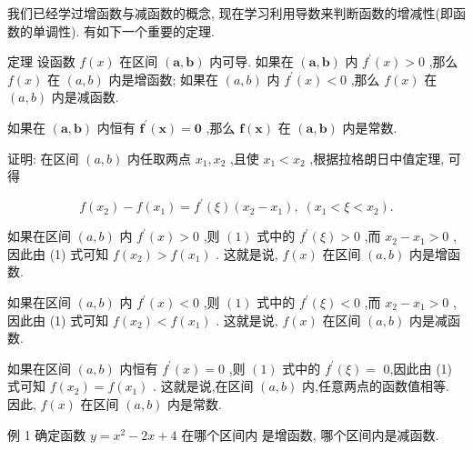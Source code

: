 \documentclass[lang=cn,newtx,10pt,scheme=chinese]{elegantbook}
\begin{document}
我们已经学过增函数与减函数的概念, 现在学习利用导数来判断函数的增减性(即函数的单调性). 有如下一个重要的定理.

定理 设函数 \(f\left( x\right)\) 在区间 \(\left( {\mathbf{a},\mathbf{b}}\right)\) 内可导. 如果在 \(\left( {\mathbf{a},\mathbf{b}}\right)\) 内 \({f}^{\prime }\left( x\right) > 0\) ,那么 \(f\left( x\right)\) 在 \(\left( {a,b}\right)\) 内是增函数; 如果在 \(\left( {a,b}\right)\) 内 \({f}^{\prime }\left( x\right) < 0\) ,那么 \(f\left( x\right)\) 在 \(\left( {a,b}\right)\) 内是减函数.

如果在 \(\left( {\mathbf{a},\mathbf{b}}\right)\) 内恒有 \({\mathbf{f}}^{\prime }\left( \mathbf{x}\right) = \mathbf{0}\) ,那么 \(\mathbf{f}\left( \mathbf{x}\right)\) 在 \(\left( {\mathbf{a},\mathbf{b}}\right)\) 内是常数.

证明: 在区间 \(\left( {a,b}\right)\) 内任取两点 \({x}_{1},{x}_{2}\) ,且使 \({x}_{1} < {x}_{2}\) ,根据拉格朗日中值定理, 可得

\[
f\left( {x}_{2}\right) - f\left( {x}_{1}\right) = {f}^{\prime }\left( \xi \right) \left( {{x}_{2} - {x}_{1}}\right) ,\;\left( {{x}_{1} < \xi < {x}_{2}}\right) . \tag{1}
\]

如果在区间 \(\left( {a,b}\right)\) 内 \({f}^{\prime }\left( x\right) > 0\) ,则 \(\left( 1\right)\) 式中的 \({f}^{\prime }\left( \xi \right) > 0\) ,而 \({x}_{2} - {x}_{1} > 0\) ,因此由 (1) 式可知 \(f\left( {x}_{2}\right) > f\left( {x}_{1}\right)\) . 这就是说, \(f\left( x\right)\) 在区间 \(\left( {a,b}\right)\) 内是增函数.

如果在区间 \(\left( {a,b}\right)\) 内 \({f}^{\prime }\left( x\right) < 0\) ,则 \(\left( 1\right)\) 式中的 \({f}^{\prime }\left( \xi \right) < 0\) ,而 \({x}_{2} - {x}_{1} > 0\) ,因此由 (1) 式可知 \(f\left( {x}_{2}\right) < f\left( {x}_{1}\right)\) . 这就是说, \(f\left( x\right)\) 在区间 \(\left( {a,b}\right)\) 内是减函数.

如果在区间 \(\left( {a,b}\right)\) 内恒有 \({f}^{\prime }\left( x\right) = 0\) ,则 \(\left( 1\right)\) 式中的 \({f}^{\prime }\left( \xi \right) =\) 0,因此由 (1) 式可知 \(f\left( {x}_{2}\right) = f\left( {x}_{1}\right)\) . 这就是说,在区间 \(\left( {a,b}\right)\) 内,任意两点的函数值相等. 因此, \(f\left( x\right)\) 在区间 \(\left( {a,b}\right)\) 内是常数.

例 1 确定函数 \(y = {x}^{2} - {2x} + 4\) 在哪个区间内 是增函数, 哪个区间内是减函数.
\end{document}
